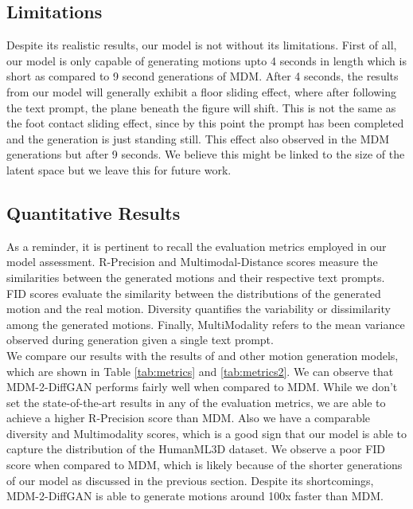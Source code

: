 \documentclass[10pt,twocolumn,letterpaper]{article}
\begin{document}
\subsection{Limitations}
Despite its realistic results, our model is not without its limitations. First of all, our model is only capable of generating motions
upto 4 seconds in length which is short as compared to 9 second generations of MDM. After 4 seconds, the results from our model will generally exhibit a floor sliding effect, where after following the text prompt, the plane beneath the
figure will shift. This is not the same as the foot contact sliding effect, since by this point the prompt has been completed and the generation is just 
standing still. This effect also observed in the MDM generations but after 9 seconds. We believe this might be linked to the size of the latent space but
we leave this for future work.


\subsection{Quantitative Results}

As a reminder, it is pertinent to recall the evaluation metrics employed in our model assessment. R-Precision and Multimodal-Distance scores measure the similarities 
between the generated motions and their respective text prompts. FID scores evaluate the similarity between the distributions of the generated motion and the real 
motion. Diversity quantifies the variability or dissimilarity among the generated motions. Finally, MultiModality refers to the mean variance observed during 
generation given a single text prompt.
\\

We compare our results with the results of \cite{Tevet23} and other motion generation models, which are shown in Table \ref{tab:metrics} 
and \ref{tab:metrics2}. We can observe that MDM-2-DiffGAN performs fairly well when compared to MDM. While we don't set the state-of-the-art
results in any of the evaluation metrics, we are able to achieve a higher R-Precision score than MDM. Also we have a comparable diversity and Multimodality
scores, which is a good sign that our model is able to capture the distribution of the HumanML3D dataset. We observe a poor FID score when
compared to MDM, which is likely because of the shorter generations of our model as discussed in the previous section.  Despite its shortcomings, MDM-2-DiffGAN is able to generate motions
around 100x faster than MDM.
\end{document}
